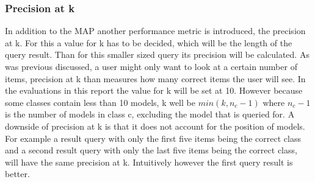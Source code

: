 \documentclass{bigdata}
\begin{document}
\subsubsection{Precision at k}
In addition to the MAP another performance metric is introduced, the precision at k. For this a value for k has to be decided, which will be the length of the query result. Than for this smaller sized query its precision will be calculated. As was previous discussed, a user might only want to look at a certain number of items, precision at k than measures how many correct items the user will see. In the evaluations in this report the value for k will be set at 10. However because some classes contain less than 10 models, k well be $min(k,n_c-1)$ where $n_c - 1$ is the number of models in class c, excluding the model that is queried for. 
A downside of precision at k is that it does not account for the position of models. For example a result query with only the first five items being the correct class and a second result query with only  the last five items being the correct class, will have the same precision at k. Intuitively however the first query result is better. 
\end{document}
